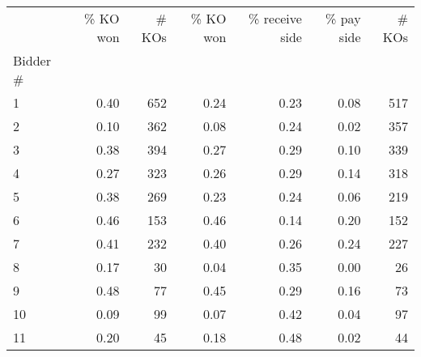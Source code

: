 \begin{tabular}{lrrrrrr}
\toprule
{} &  \% KO won &  \# KOs &  \% KO won &  \% receive side &  \% pay side &  \# KOs \\
Bidder \# &           &        &           &                 &             &        \\
\midrule
1        &      0.40 &    652 &      0.24 &            0.23 &        0.08 &    517 \\
2        &      0.10 &    362 &      0.08 &            0.24 &        0.02 &    357 \\
3        &      0.38 &    394 &      0.27 &            0.29 &        0.10 &    339 \\
4        &      0.27 &    323 &      0.26 &            0.29 &        0.14 &    318 \\
5        &      0.38 &    269 &      0.23 &            0.24 &        0.06 &    219 \\
6        &      0.46 &    153 &      0.46 &            0.14 &        0.20 &    152 \\
7        &      0.41 &    232 &      0.40 &            0.26 &        0.24 &    227 \\
8        &      0.17 &     30 &      0.04 &            0.35 &        0.00 &     26 \\
9        &      0.48 &     77 &      0.45 &            0.29 &        0.16 &     73 \\
10       &      0.09 &     99 &      0.07 &            0.42 &        0.04 &     97 \\
11       &      0.20 &     45 &      0.18 &            0.48 &        0.02 &     44 \\
\bottomrule
\end{tabular}
